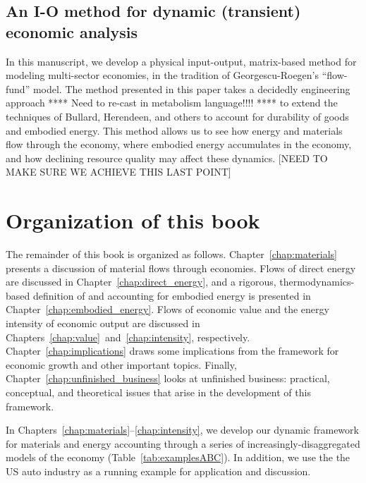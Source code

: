 \subsection{An I-O method for dynamic (transient) economic analysis}

In this manuscript, we develop a physical input-output, 
matrix-based method for modeling multi-sector economies, 
in the tradition of Georgescu-Roegen's ``flow-fund'' 
model.\cite{G-R1979a, G-R1979b} 
The method presented in this paper takes a decidedly engineering approach
**** Need to re-cast in metabolism language!!!! **** 
to extend the techniques of Bullard, Herendeen, and others 
to account for durability of goods and embodied energy. 
This method allows us to see how energy and materials flow through the economy, 
where embodied energy accumulates in the economy, 
and how declining resource quality may affect these dynamics. 
[NEED TO MAKE SURE WE ACHIEVE THIS LAST POINT]

\section{Organization of this book}

The remainder of this book is organized as follows. 
Chapter~\ref{chap:materials} presents a discussion of material flows through economies.
Flows of direct energy are discussed in Chapter~\ref{chap:direct_energy}, 
and a rigorous, thermodynamics-based definition of and accounting for 
embodied energy is presented in Chapter~\ref{chap:embodied_energy}. 
Flows of economic value and the energy intensity of economic output are
discussed in Chapters~\ref{chap:value}~and~\ref{chap:intensity}, respectively.
Chapter~\ref{chap:implications} draws some implications 
from the framework for economic growth and other important topics.
Finally, Chapter~\ref{chap:unfinished_business} looks at 
unfinished business: practical, conceptual, and theoretical issues
that arise in the development of this framework.

In Chapters~\ref{chap:materials}--\ref{chap:intensity},
we develop our dynamic framework for materials and energy accounting
through a series of increasingly-disaggregated
models of the economy (Table~\ref{tab:examplesABC}). 
In addition, we use the the US auto industry 
as a running example for application and discussion.

